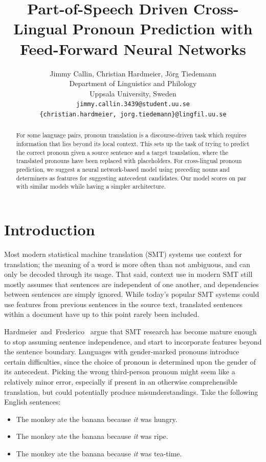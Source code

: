 \documentclass[11pt]{article}
\title{Part-of-Speech Driven Cross-Lingual Pronoun Prediction with Feed-Forward Neural Networks}
\author{Jimmy Callin, Christian Hardmeier, Jörg Tiedemann \\
  Department of Linguistics and Philology \\
  Uppsala University, Sweden \\
  {\tt \normalsize jimmy.callin.3439@student.uu.se} \\ {\tt \normalsize \{christian.hardmeier, jorg.tiedemann\}@lingfil.uu.se}}
\date{}
\begin{document}
\maketitle
\begin{abstract}
    For some language pairs, pronoun translation is a discourse-driven task which requires information that lies beyond its local context. This sets up the task of trying to predict the correct pronoun given a source sentence and a target translation, where the translated pronouns have been replaced with placeholders. For cross-lingual pronoun prediction, we suggest a neural network-based model using preceding nouns and determiners as features for suggesting antecedent candidates. Our model scores on par with similar models while having a simpler architecture.
\end{abstract}


\section{Introduction}

Most modern statistical machine translation (SMT) systems use context for translation; the meaning of a word is more often than not ambiguous, and can only be decoded through its usage.
That said, context use in modern SMT still mostly assumes that sentences are independent of one another, and dependencies between sentences are simply ignored.
While today's popular SMT systems could use features from previous sentences in the source text, translated sentences within a document have up to this point rarely been included.

Hardmeier~and~Frederico~ argue that SMT research has become mature enough to stop assuming sentence independence, and start to incorporate features beyond the sentence boundary.
Languages with gender-marked pronouns introduce certain difficulties, since the choice of pronoun is determined upon the gender of its antecedent.
Picking the wrong third-person pronoun might seem like a relatively minor error, especially if present in an otherwise comprehensible translation, but could potentially produce misunderstandings. Take the following English sentences:

\begin{itemize}
    \setlength{\itemsep}{-0.2em}
    \item The monkey ate the banana because \emph{it} was hungry.
    \item The monkey ate the banana because \emph{it} was ripe.
    \item The monkey ate the banana because \emph{it} was tea-time.
\end{itemize}
\end{document}
